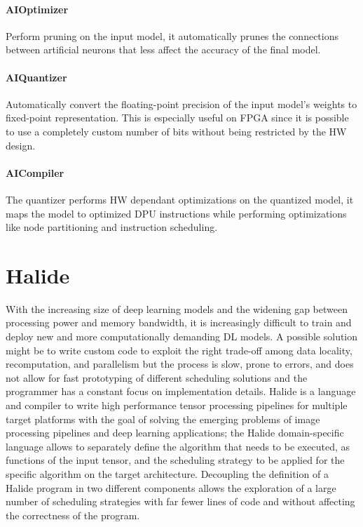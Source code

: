 \documentclass[../main.tex]{subfiles}
\begin{document}
\paragraph{AIOptimizer}
Perform pruning on the input model, it automatically prunes the connections between artificial neurons that less affect the accuracy of the final model.

\paragraph{AIQuantizer}
Automatically convert the floating-point precision of the input model's weights to fixed-point representation. This is especially useful on FPGA since it is possible to use a completely custom number of bits without being restricted by the HW design.

\paragraph{AICompiler}
The quantizer performs HW dependant optimizations on the quantized model, it maps the model to optimized DPU instructions while performing optimizations like node partitioning and instruction scheduling.

\section{Halide}
\label {halide}
With the increasing size of deep learning models and the widening gap between processing power and memory bandwidth, it is increasingly difficult to train and deploy new and more computationally demanding DL models. A possible solution might be to write custom code to exploit the right trade-off among data locality, recomputation, and parallelism but the process is slow, prone to errors, and does not allow for fast prototyping of different scheduling solutions and the programmer has a constant focus on implementation details. 
Halide \cite{halide1} is a language and compiler to write high performance tensor processing pipelines for multiple target platforms with the goal of solving the emerging problems of image processing pipelines and deep learning applications; the Halide domain-specific language allows to separately define the algorithm that needs to be executed, as functions of the input tensor, and the scheduling strategy to be applied for the specific algorithm on the target architecture. Decoupling the definition of a Halide program in two different components allows the exploration of a large number of scheduling strategies with far fewer lines of code and without affecting the correctness of the program.
\end{document}
